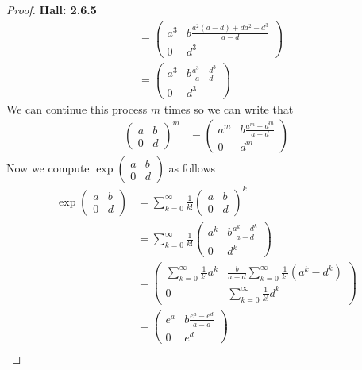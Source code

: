 \documentclass[11pt]{article}
\theoremstyle{definition}
\begin{document}
\begin{proof}{\textbf{Hall: 2.6.5}}
\begin{align*}
        &= \begin{pmatrix}
            a^3 & b\frac{a^2(a - d) + da^2 - d^3}{a - d}\\ 0 & d^3
        \end{pmatrix}\\
        &= \begin{pmatrix}
            a^3 & b\frac{a^3 - d^3}{a - d}\\ 0 & d^3
        \end{pmatrix}
    \end{align*}
    We can continue this process $m$ times so we can write that
    \begin{align*}
        \begin{pmatrix} a & b\\ 0 & d \end{pmatrix}^m
        &= \begin{pmatrix}
            a^m & b\frac{a^m - d^m}{a - d}\\ 0 & d^m
        \end{pmatrix}
    \end{align*}
    Now we compute $\exp\begin{pmatrix} a & b\\ 0 & d\end{pmatrix}$ as follows
    \begin{align*}
        \exp\begin{pmatrix} a & b\\ 0 & d\end{pmatrix}
        &= \sum_{k = 0}^\infty\frac{1}{k!}
        \begin{pmatrix} a & b\\ 0 & d \end{pmatrix}^k\\
        &= \sum_{k=0}^\infty\frac{1}{k!}
        \begin{pmatrix} a^k & b\frac{a^k - d^k}{a - d}\\ 0 & d^k\end{pmatrix}\\
        &= \begin{pmatrix}
            \sum_{k=0}^\infty\frac{1}{k!} a^k &
            \frac{b}{a - d}\sum_{k=0}^\infty\frac{1}{k!}(a^k - d^k)\\
            0 & \sum_{k=0}^\infty\frac{1}{k!} d^k
        \end{pmatrix}\\
        &= \begin{pmatrix}e^a & b\frac{e^a - e^d}{a - d}\\ 0 & e^d\end{pmatrix}\\

\end{align*}
\end{proof}
\end{document}
